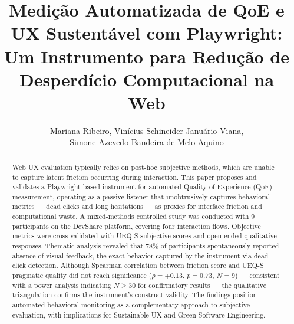 \documentclass[12pt]{article}
\title{Medição Automatizada de QoE e UX Sustentável com Playwright:\\
       Um Instrumento para Redução de Desperdício Computacional na Web}
\author{Mariana Ribeiro\inst{1}, Vinícius Schineider Januário Viana\inst{1},\\
        Simone Azevedo Bandeira de Melo Aquino\inst{1}}
\begin{document}
\maketitle

\begin{abstract}
Web UX evaluation typically relies on post-hoc subjective methods, which are
unable to capture latent friction occurring during interaction. This paper
proposes and validates a Playwright-based instrument for automated Quality of
Experience (QoE) measurement, operating as a passive listener that
unobtrusively captures behavioral metrics --- dead clicks and long hesitations
--- as proxies for interface friction and computational waste. A mixed-methods
controlled study was conducted with 9 participants on the DevShare platform,
covering four interaction flows. Objective metrics were cross-validated with
UEQ-S subjective scores and open-ended qualitative responses. Thematic
analysis revealed that 78\% of participants spontaneously reported absence of
visual feedback, the exact behavior captured by the instrument via dead click
detection. Although Spearman correlation between friction score and UEQ-S
pragmatic quality did not reach significance ($\rho = +0.13$, $p = 0.73$,
$N = 9$) --- consistent with a power analysis indicating $N \geq 30$ for
confirmatory results --- the qualitative triangulation confirms the
instrument's construct validity. The findings position automated behavioral
monitoring as a complementary approach to subjective evaluation, with
implications for Sustainable UX and Green Software Engineering.
\end{abstract}
\end{document}
